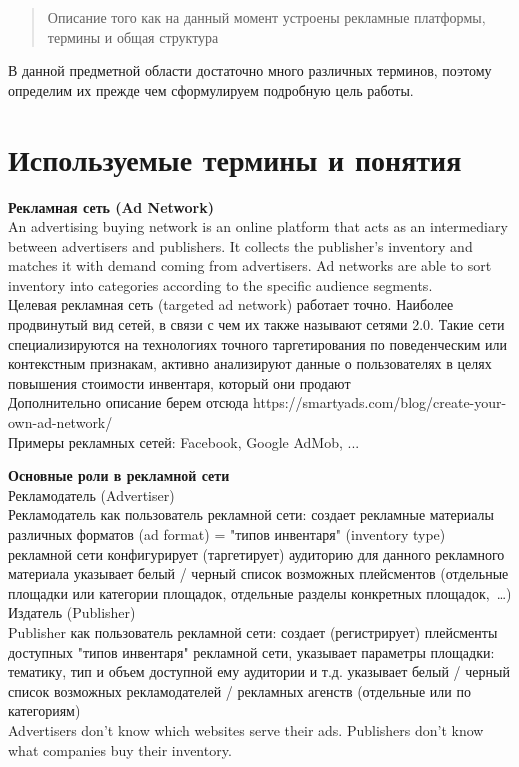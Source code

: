 \documentclass[specification,annotation,times]{itmo-student-thesis}
\begin{document}
\startrelatedwork %

\begin{quotation}
  Описание того как на данный момент устроены рекламные платформы, термины и общая структура
\end{quotation}

В данной предметной области достаточно много различных терминов, поэтому 
определим их прежде чем сформулируем подробную цель работы.

\section{Используемые термины и понятия}\label{sec:terms}


\textbf{Рекламная сеть (Ad Network)}
\\
An advertising buying network is an online platform that acts as an intermediary between advertisers and publishers. It collects the publisher's inventory and matches it with demand coming from advertisers. Ad networks are able to sort inventory into categories according to the specific audience segments.
\\
Целевая рекламная сеть (targeted ad network) работает точно. Наиболее продвинутый вид сетей, в связи с чем их также называют сетями 2.0. Такие сети специализируются на технологиях точного таргетирования по поведенческим или контекстным признакам, активно анализируют данные о пользователях в целях повышения стоимости инвентаря, который они продают
\\
Дополнительно описание берем отсюда https://smartyads.com/blog/create-your-own-ad-network/
\\
Примеры рекламных сетей: Facebook, Google AdMob, ...


\textbf{Основные роли в рекламной сети}
\\
Рекламодатель (Advertiser)
\\
Рекламодатель как пользователь рекламной сети:
создает рекламные материалы различных форматов (ad format) = "типов инвентаря" (inventory type) рекламной сети
конфигурирует (таргетирует) аудиторию для данного рекламного материала
указывает белый / черный список возможных плейсментов (отдельные площадки или категории площадок, отдельные разделы конкретных площадок, …)
\\
Издатель (Publisher)
\\
Publisher как пользователь рекламной сети:
создает (регистрирует) плейсменты доступных "типов инвентаря" рекламной сети, указывает параметры площадки: тематику, тип и объем доступной ему аудитории и т.д.
указывает белый / черный список возможных рекламодателей / рекламных агенств (отдельные или по категориям)
\\
Advertisers don't know which websites serve their ads. Publishers don't know what companies buy their inventory.
\end{document}
